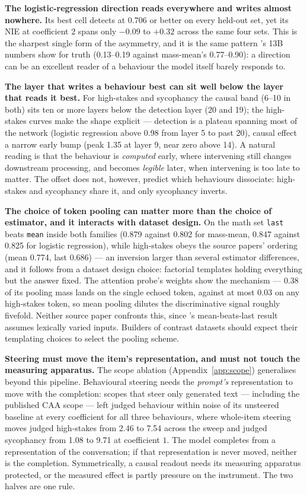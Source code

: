 \documentclass[conference]{IEEEtran}
\begin{document}
\textbf{The logistic-regression direction reads everywhere and writes almost
nowhere.} Its best cell detects at 0.706 or better on every held-out set, yet
its NIE at coefficient $2$ spans only $-0.09$ to $+0.32$ across the same four
sets. This is the sharpest single form of the asymmetry, and it is the same
pattern \citeauthor{marks2024}'s 13B numbers show for truth (0.13--0.19 against
mass-mean's 0.77--0.90): a direction can be an excellent reader of a behaviour
the model itself barely responds to.

\textbf{The layer that writes a behaviour best can sit well below the layer
that reads it best.} For high-stakes and sycophancy the causal band (6--10 in
both) sits ten or more layers below the detection layer (20 and 19); the
high-stakes curves make the shape explicit --- detection is a plateau spanning
most of the network (logistic regression above 0.98 from layer 5 to past 20),
causal effect a narrow early bump (peak 1.35 at layer 9, near zero above 14). A
natural reading is that the behaviour is \emph{computed} early, where
intervening still changes downstream processing, and becomes \emph{legible}
later, when intervening is too late to matter. The offset does not, however,
predict which behaviours dissociate: high-stakes and sycophancy share it, and
only sycophancy inverts.

\textbf{The choice of token pooling can matter more than the choice of
estimator, and it interacts with dataset design.} On the math set \texttt{last}
beats \texttt{mean} inside both families (0.879 against 0.802 for mass-mean,
0.847 against 0.825 for logistic regression), while high-stakes obeys the
source papers' ordering (mean 0.774, last 0.686) --- an inversion larger than
several estimator differences, and it follows from a dataset design
choice: factorial templates holding everything but the answer fixed. The
attention probe's weights show the mechanism --- 0.38 of its pooling mass lands
on the single echoed token, against at most 0.03 on any high-stakes token, so
mean pooling dilutes the discriminative signal roughly
fivefold. Neither source paper confronts this, since
\citeauthor{mckenzie2025}'s mean-beats-last result assumes lexically varied
inputs. Builders of contrast datasets should expect their templating choices to
select the pooling scheme.

\textbf{Steering must move the item's representation, and must not touch the
measuring apparatus.} The scope ablation
(Appendix~\ref{app:scope}) generalises beyond this pipeline. Behavioural
steering needs the \emph{prompt's} representation to move with the completion:
scopes that steer only generated text --- including the published CAA scope ---
left judged behaviour within noise of its unsteered baseline at every
coefficient for all three behaviours, where whole-item steering moves judged
high-stakes from 2.46 to 7.54 across the sweep and judged sycophancy from 1.08
to 9.71 at coefficient $1$. The model completes from a representation of the
conversation; if that representation is never moved, neither is the completion. Symmetrically, a causal readout needs its
measuring apparatus protected, or the measured effect is partly pressure on the
instrument. The two halves are one rule.
\end{document}
